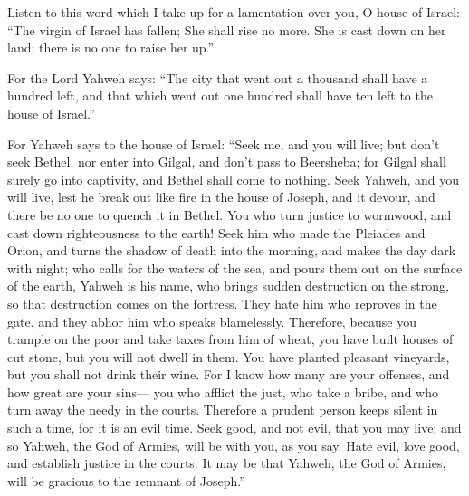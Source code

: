  Listen to this word which I take up for a lamentation over
you, O house of Israel:  ``The virgin of Israel has fallen;
She shall rise no more. She is cast down on her land; there is no one to
raise her up.''

 For the Lord Yahweh says: ``The city that went out a
thousand shall have a hundred left, and that which went out one hundred
shall have ten left to the house of Israel.''

 For Yahweh says to the house of Israel: ``Seek me, and you
will live;  but don't seek Bethel, nor enter into Gilgal,
and don't pass to Beersheba; for Gilgal shall surely go into captivity,
and Bethel shall come to nothing.  Seek Yahweh, and you will
live, lest he break out like fire in the house of Joseph, and it devour,
and there be no one to quench it in Bethel.  You who turn
justice to wormwood, and cast down righteousness to the earth!
 Seek him who made the Pleiades and Orion, and turns the
shadow of death into the morning, and makes the day dark with night; who
calls for the waters of the sea, and pours them out on the surface of
the earth, Yahweh is his name,  who brings sudden
destruction on the strong, so that destruction comes on the fortress.
 They hate him who reproves in the gate, and they abhor him
who speaks blamelessly.  Therefore, because you trample on
the poor and take taxes from him of wheat, you have built houses of cut
stone, but you will not dwell in them. You have planted pleasant
vineyards, but you shall not drink their wine.  For I know
how many are your offenses, and how great are your sins--- you who
afflict the just, who take a bribe, and who turn away the needy in the
courts.  Therefore a prudent person keeps silent in such a
time, for it is an evil time.  Seek good, and not evil,
that you may live; and so Yahweh, the God of Armies, will be with you,
as you say.  Hate evil, love good, and establish justice in
the courts. It may be that Yahweh, the God of Armies, will be gracious
to the remnant of Joseph.''

